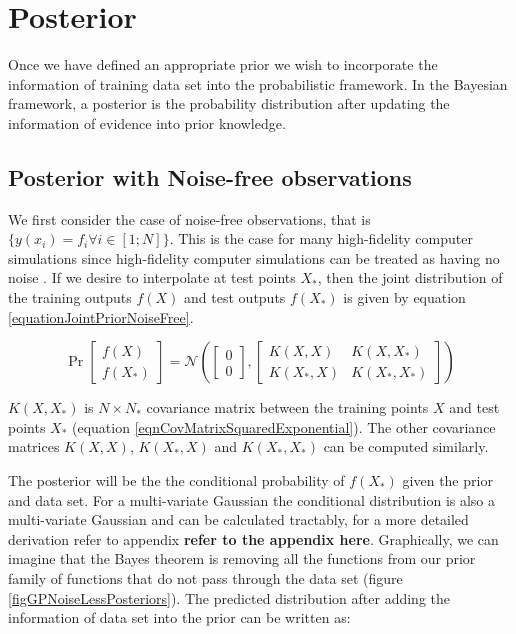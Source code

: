 \section{Posterior}\label{secPosterior}
Once we have defined an appropriate prior we wish to incorporate the information of training data set into the probabilistic framework. In the Bayesian framework, a posterior is the probability distribution after updating the information of evidence into prior knowledge. 


\subsection{Posterior with Noise-free observations}\label{subSecPosteriorNoiseFree}
We first consider the case of noise-free observations, that is $\{y(x_{i}) = f_{i} \forall i \in [1; N] \}$. This is the case for many high-fidelity computer simulations since high-fidelity computer simulations can be treated as having no noise \cite{sacks1989design}. If we desire to interpolate at test points $X_{*}$, then the joint distribution of the training outputs $f(X)$ and test outputs $f(X_{*})$ is given by equation \ref{equationJointPriorNoiseFree}.

\begin{equation}\label{equationJointPriorNoiseFree}
\Pr\left [ \begin{matrix}
f(X)
\\ f(X_{*})
\end{matrix} \right ] = 
\mathcal{N}\left (\left [ \begin{matrix} 0 \\ 0 \end{matrix} \right ]
, 
\left [ \begin{matrix}
K(X, X) & K(X, X_{*})\\ 
K(X_{*}, X) & K(X_{*}, X_{*})
\end{matrix} \right ]
\right)
\end{equation}

$K(X, X_{*})$ is $N \times N_{*}$ covariance matrix between the training points $X$ and test points $X_{*}$ (equation \ref{eqnCovMatrixSquaredExponential}). The other covariance matrices $K(X, X)$, $K(X_{*}, X)$ and $K(X_{*}, X_{*})$ can be computed similarly. 

The posterior will be the the conditional probability of $f(X_{*})$ given the prior and data set. For a multi-variate Gaussian the conditional distribution is also a multi-variate Gaussian and can be calculated tractably, for a more detailed derivation refer to appendix \textbf{refer to the appendix here}. Graphically, we can imagine that the Bayes theorem is removing all the functions from our prior family of functions that do not pass through the data set (figure \ref{figGPNoiseLessPosteriors}). The predicted distribution after adding the information of data set into the prior can be written as:

